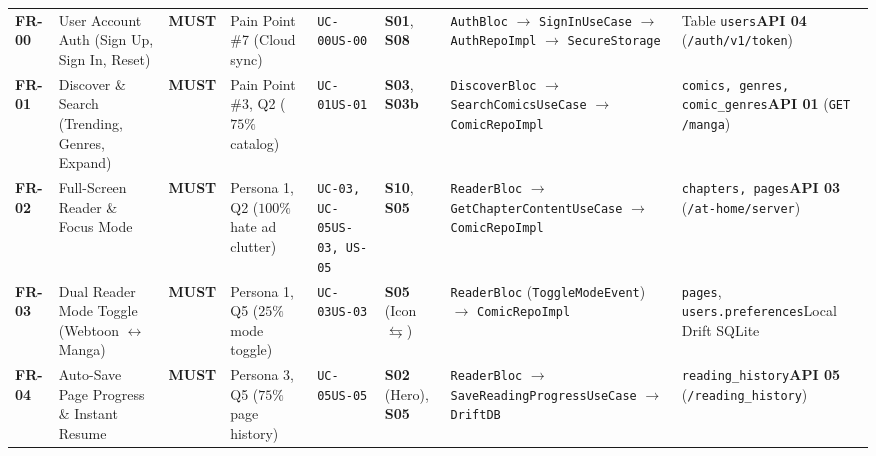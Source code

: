 \begin{scriptsize}
\begin{longtable}{C{1.1cm} L{2.4cm} C{1.45cm} L{1.7cm} C{1.2cm} C{1.2cm} L{3.3cm} L{2.75cm}}
\mbox{\textbf{FR-00}} & User Account Auth (Sign Up, Sign In, Reset) & \textbf{MUST} & Pain Point \#7 (Cloud sync) & \texttt{UC-00}\newline \texttt{US-00} & \textbf{S01}, \textbf{S08} & \texttt{AuthBloc} $\to$ \allowbreak\texttt{SignInUseCase} $\to$ \allowbreak\texttt{AuthRepoImpl} $\to$ \allowbreak\texttt{SecureStorage} & Table \texttt{users}\newline \textbf{API 04} (\texttt{/auth/v1/token}) \\
\mbox{\textbf{FR-01}} & Discover \& Search (Trending, Genres, Expand) & \textbf{MUST} & Pain Point \#3, Q2 ($75\%$ catalog) & \texttt{UC-01}\newline \texttt{US-01} & \textbf{S03}, \textbf{S03b} & \texttt{DiscoverBloc} $\to$ \allowbreak\texttt{SearchComicsUseCase} $\to$ \allowbreak\texttt{ComicRepoImpl} & \texttt{comics, genres, comic\_\allowbreak genres}\newline \textbf{API 01} (\texttt{GET /manga}) \\
\mbox{\textbf{FR-02}} & Full-Screen Reader \& Focus Mode & \textbf{MUST} & Persona 1, Q2 ($100\%$ hate ad clutter) & \texttt{UC-03, UC-05}\newline \texttt{US-03, US-05} & \textbf{S10}, \textbf{S05} & \texttt{ReaderBloc} $\to$ \allowbreak\texttt{Get\allowbreak Chapter\allowbreak Content\allowbreak UseCase} $\to$ \allowbreak\texttt{ComicRepoImpl} & \texttt{chapters, pages}\newline \textbf{API 03} (\texttt{/at-home/server}) \\
\mbox{\textbf{FR-03}} & Dual Reader Mode Toggle (Webtoon $\leftrightarrow$ Manga) & \textbf{MUST} & Persona 1, Q5 ($25\%$ mode toggle) & \texttt{UC-03}\newline \texttt{US-03} & \textbf{S05} (Icon $\leftrightarrows$) & \texttt{ReaderBloc} (\texttt{ToggleModeEvent}) $\to$ \allowbreak\texttt{ComicRepoImpl} & \texttt{pages}, \texttt{users.preferences}\newline Local Drift SQLite \\
\mbox{\textbf{FR-04}} & Auto-Save Page Progress \& Instant Resume & \textbf{MUST} & Persona 3, Q5 ($75\%$ page history) & \texttt{UC-05}\newline \texttt{US-05} & \textbf{S02} (Hero), \textbf{S05} & \texttt{ReaderBloc} $\to$ \allowbreak\texttt{Save\allowbreak Reading\allowbreak Progress\allowbreak UseCase} $\to$ \allowbreak\texttt{DriftDB} & \texttt{reading\_\allowbreak history}\newline \textbf{API 05} (\texttt{/reading\_history}) \\

\end{longtable}
\end{scriptsize}

